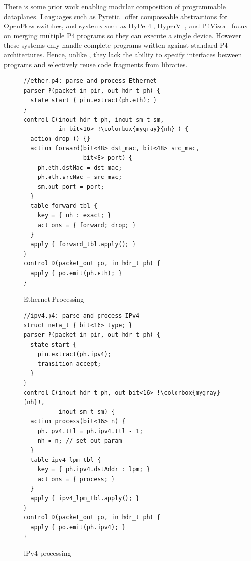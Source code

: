 \documentclass[letterpaper,twocolumn,10pt]{article}
\begin{document}
There is some prior work enabling modular composition of programmable
dataplanes. Languages such as Pyretic~\cite{180291} offer composeable
abstractions for OpenFlow switches, and systems such as HyPer4
\cite{Hancock:2016:HUP:2999572.2999607}, HyperV~\cite{8038396}, and
P4Visor~\cite{Zheng:2018:PLV:3281411.3281436} focus on merging
multiple P4 programs so they can execute a single device. However
these systems only handle complete programs written against standard
P4 architectures. Hence, unlike \ulang, they lack the ability to
specify interfaces between programs and selectively reuse code
fragments from libraries.

\begin{figure}[t]
\begin{lstlisting}[frame=none, escapechar=!]
//ether.p4: parse and process Ethernet
parser P(packet_in pin, out hdr_t ph) {
  state start { pin.extract(ph.eth); }
}
control C(inout hdr_t ph, inout sm_t sm,
          in bit<16> !\colorbox{mygray}{nh}!) {
  action drop () {}
  action forward(bit<48> dst_mac, bit<48> src_mac, 
                 bit<8> port) {
    ph.eth.dstMac = dst_mac;
    ph.eth.srcMac = src_mac;
    sm.out_port = port;
  }
  table forward_tbl {
    key = { nh : exact; }
    actions = { forward; drop; }
  }
  apply { forward_tbl.apply(); }
}
control D(packet_out po, in hdr_t ph) {
  apply { po.emit(ph.eth); }
}
\end{lstlisting}
\caption{Ethernet Processing}
\label{fig:ether.p4}
\end{figure}

\begin{figure}[t]
\begin{lstlisting}[frame=none, escapechar=!]
//ipv4.p4: parse and process IPv4
struct meta_t { bit<16> type; }
parser P(packet_in pin, out hdr_t ph) {
  state start {
    pin.extract(ph.ipv4);
    transition accept;
  }
}
control C(inout hdr_t ph, out bit<16> !\colorbox{mygray}{nh}!, 
          inout sm_t sm) {
  action process(bit<16> n) {
    ph.ipv4.ttl = ph.ipv4.ttl - 1;
    nh = n; // set out param
  }
  table ipv4_lpm_tbl {
    key = { ph.ipv4.dstAddr : lpm; }
    actions = { process; }
  }
  apply { ipv4_lpm_tbl.apply(); }
}
control D(packet_out po, in hdr_t ph) {
  apply { po.emit(ph.ipv4); }
}
\end{lstlisting}
\caption{IPv4 processing}
\label{fig:ipv4.p4}
\end{figure}
\end{document}
